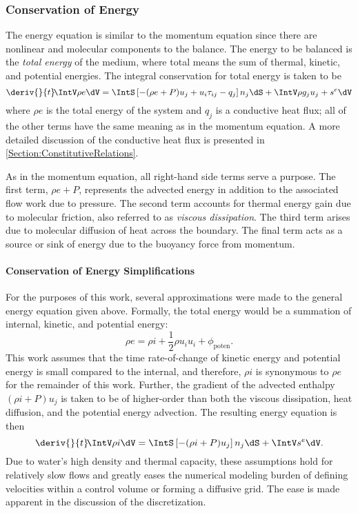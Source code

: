 \subsubsection{Conservation of Energy}
The energy equation is similar to the momentum equation since there are nonlinear and molecular components to the balance.
The energy to be balanced is the \textit{total energy} of the medium, where total means the sum of thermal, kinetic, and potential energies.
The integral conservation for total energy is taken to be
\begin{equation}
   \deriv{}{t}\! \IntV \rho e \dV = \IntS \left[- (\rho{e} + P) u_j + u_i \tau_{ij} - q_j\right] n_j\dS + \IntV \rho g_j u_j + s^e \dV
    \label{Eqn:IntegralCoE}
\end{equation}
where $\rho{e}$ is the total energy of the system and $q_j$ is a conductive heat flux; all of the other terms have the same meaning as in the momentum equation.
A more detailed discussion of the conductive heat flux is presented in \cref{Section:ConstitutiveRelations}.

As in the momentum equation, all right-hand side terms serve a purpose.
The first term, $\rho{e} + P$, represents the advected energy in addition to the associated flow work due to pressure.
The second term accounts for thermal energy gain due to molecular friction, also referred to as \textit{viscous dissipation}.
The third term arises due to molecular diffusion of heat across the boundary.
The final term acts as a source or sink of energy due to the buoyancy force from momentum.


\paragraph{Conservation of Energy Simplifications}

For the purposes of this work, several approximations were made to the general energy equation given above.  Formally, the total energy would be a summation of internal, kinetic, and potential energy:
\begin{equation}
    \rho e = \rho i + \frac{1}{2}\rho u_i u_i + \phi_{\text{poten}}.
\end{equation}
This work assumes that the time rate-of-change of kinetic energy and potential energy is small compared to the internal, and therefore, $\rho i$ is synonymous to $\rho e$ for the remainder of this work.
Further, the gradient of the advected enthalpy $(\rho i + P)u_j$ is taken to be of higher-order than both the viscous dissipation, heat diffusion, and the potential energy advection.
The resulting energy equation is then 
\begin{equation}
    \deriv{}{t}\! \IntV \rho i \dV = \IntS \left[- (\rho{i} + P) u_j\right] n_j\dS + \IntV s^e \dV.
\end{equation}
Due to water's high density and thermal capacity, these assumptions hold for relatively slow flows and greatly eases the numerical modeling burden of defining velocities within a control volume or forming a diffusive grid.
The ease is made apparent in the discussion of the discretization.



